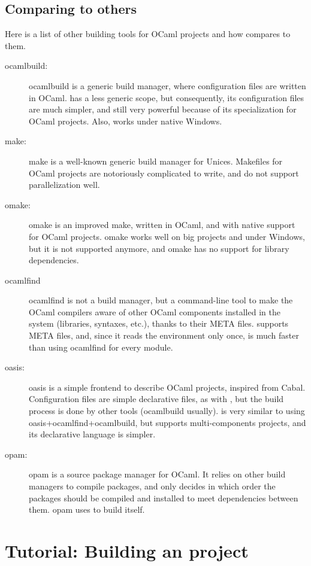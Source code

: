 \section{Comparing \ocpbuild{} to others}

Here is a list of other building tools for OCaml projects and how
\ocpbuild{} compares to them.

\begin{description}
\item[ocamlbuild:] ocamlbuild is a generic build manager, where
  configuration files are written in OCaml. \ocpbuild{} has a less
  generic scope, but consequently, its configuration files are much
  simpler, and still very powerful because of its specialization for
  OCaml projects. Also, \ocpbuild{} works under native Windows.
\item[make:] make is a well-known generic build manager for
  Unices. Makefiles for OCaml projects are notoriously complicated to
  write, and do not support parallelization well.
\item[omake:] omake is an improved make, written in OCaml, and with
  native support for OCaml projects. omake works well on big projects
  and under Windows, but it is not supported anymore, and omake has no
  support for library dependencies.
\item[ocamlfind] ocamlfind is not a build manager, but a command-line
  tool to make the OCaml compilers aware of other OCaml components
  installed in the system (libraries, syntaxes, etc.), thanks to their
  META files. \ocpbuild{} supports META files, and, since it reads the
  environment only once, is much faster than using ocamlfind for every
  module.
\item[oasis:] oasis is a simple frontend to describe OCaml projects,
  inspired from Cabal. Configuration files are simple declarative
  files, as with \ocpbuild{}, but the build process is done by other
  tools (ocamlbuild usually). \ocpbuild{} is very similar to using
  oasis+ocamlfind+ocamlbuild, but supports multi-components projects,
  and its declarative language is simpler.
\item[opam:] opam is a source package manager for OCaml. It relies on
  other build managers to compile packages, and only decides in which
  order the packages should be compiled and installed to meet
  dependencies between them. opam uses \ocpbuild{} to build itself.
\end{description}


\chapter{Tutorial: Building an \ocpbuild{} project}

